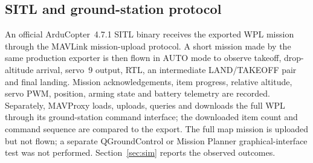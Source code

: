 \subsection{SITL and ground-station protocol}
An official ArduCopter~4.7.1 SITL binary receives the exported WPL mission through the MAVLink mission-upload protocol. A short mission made by the same production exporter is then flown in AUTO mode to observe takeoff, drop-altitude arrival, servo~9 output, RTL, an intermediate LAND/TAKEOFF pair and final landing. Mission acknowledgements, item progress, relative altitude, servo PWM, position, arming state and battery telemetry are recorded. Separately, MAVProxy loads, uploads, queries and downloads the full WPL through its ground-station command interface; the downloaded item count and command sequence are compared to the export. The full map mission is uploaded but not flown; a separate QGroundControl or Mission Planner graphical-interface test was not performed. Section~\ref{sec:sim} reports the observed outcomes.
